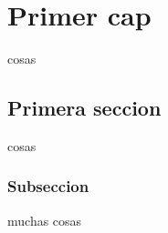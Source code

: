 
\chapter{Primer cap}


cosas


\section{Primera seccion}


cosas


\subsection{Subseccion}


muchas cosas

